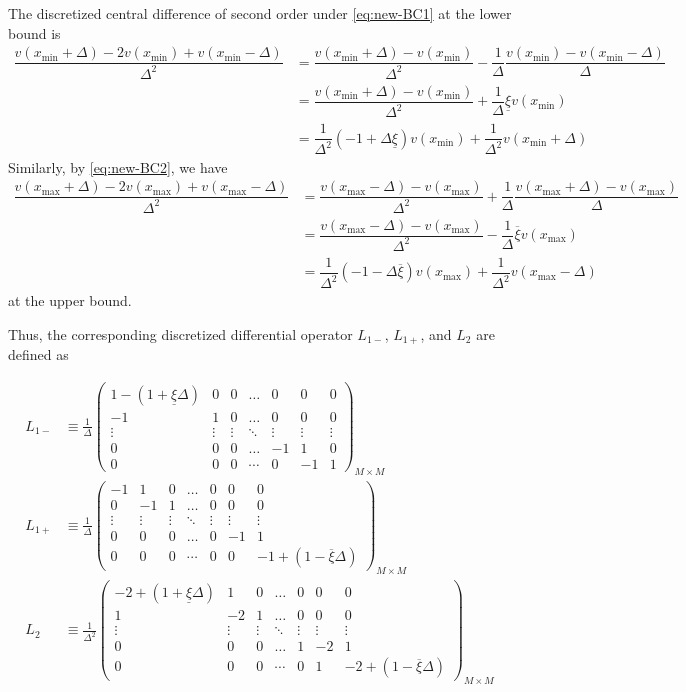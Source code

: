 \documentclass[11pt]{article}
\begin{document}
The discretized central difference of second order under \eqref{eq:new-BC1} at the lower bound is
\begin{align}
\dfrac{v ({x_{\min}} + \Delta) - 2 v({x_{\min}}) + v({x_{\min}}-\Delta)}{\Delta^2} &=   \dfrac{v({x_{\min}} + \Delta) - v({x_{\min}})}{\Delta^2} - \dfrac{1}{\Delta}\dfrac{v ({x_{\min}}) - v({x_{\min}}-\Delta) }{\Delta}  \\
&= \dfrac{v({x_{\min}} + \Delta) - v({x_{\min}})}{\Delta^2} + \dfrac{1}{\Delta} \underline{\xi} v({x_{\min}})  \\ 
&= \dfrac{1}{\Delta^2}  (- 1 + \Delta \underline{\xi}) v({x_{\min}})  + \dfrac{1}{\Delta^2}  v({x_{\min}} + \Delta)  
\end{align}
Similarly, by \eqref{eq:new-BC2}, we have
\begin{align}
\dfrac{v ({x_{\max}} + \Delta) - 2 v({x_{\max}} ) + v({x_{\max}} -\Delta)}{\Delta^2} &=   \dfrac{v({x_{\max}} - \Delta) - v({x_{\max}})}{\Delta^2} + \dfrac{1}{\Delta}\dfrac{ v({x_{\max}}+\Delta) - v ({x_{\max}}) }{\Delta}  \\
&= \dfrac{v({x_{\max}} - \Delta) - v({x_{\max}})}{\Delta^2}  - \dfrac{1}{\Delta} \overline{\xi} v({x_{\max}})  \\ 
&= \dfrac{1}{\Delta^2}  (- 1 - \Delta \overline{\xi}) v({x_{\max}})  + \dfrac{1}{\Delta^2}  v({x_{\max}} - \Delta)  
\end{align}
at the upper bound.

Thus, the corresponding discretized differential operator $L_{1-}$, $L_{1+}$, and $L_2$ are defined as 

\begin{align}
L_{1-} &\equiv \frac{1}{\Delta}\begin{pmatrix}
1 - (1 + \underline{\xi} \Delta) &0&0&\dots&0&0&0\\
-1&1&0&\dots&0&0&0\\
\vdots&\vdots&\vdots&\ddots&\vdots&\vdots&\vdots\\
0&0&0&\dots&-1&1&0\\
0&0&0&\cdots&0&-1&1
\end{pmatrix}_{M\times M}\label{eq:L-1-regular} \\
L_{1+} &\equiv \frac{1}{\Delta}\begin{pmatrix}
-1&1&0&\dots&0&0&0\\
0&-1&1&\dots&0&0&0\\
\vdots&\vdots&\vdots&\ddots&\vdots&\vdots&\vdots\\
0&0&0&\dots&0&-1&1\\
0&0&0&\cdots&0&0&-1+(1-\overline{\xi} \Delta)
\end{pmatrix}_{M\times M}\label{eq:L-1-plus-regular} \\
L_2 &\equiv \frac{1}{\Delta^2}\begin{pmatrix}
-2 + (1 + \underline{\xi}\Delta) &1&0&\dots&0&0&0\\
1&-2&1&\dots&0&0&0\\
\vdots&\vdots&\vdots&\ddots&\vdots&\vdots&\vdots\\
0&0&0&\dots&1&-2&1\\
0&0&0&\cdots&0&1&-2 + (1- \overline{\xi}\Delta)
\end{pmatrix}_{M\times M}\label{eq:L-2-regular}
\end{align}
\end{document}
